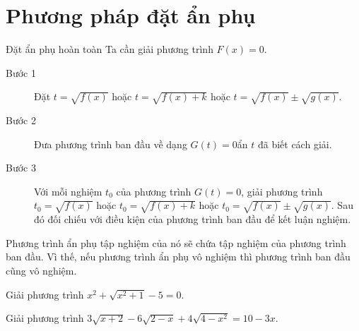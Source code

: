 
\section{Phương pháp đặt ẩn phụ}

\begin{dang}{Đặt ẩn phụ hoàn toàn}
\noindent Ta cần giải phương trình $ F(x)=0 $.
	
		\begin{description}
			\item[Bước 1] Đặt $ t=\sqrt{f(x)} $ hoặc $ t=\sqrt{f(x)+k} $ hoặc $ t=\sqrt{f(x)}\pm \sqrt{g(x)} $.
			\item[Bước 2] Đưa phương trình ban đầu về dạng $ G(t)=0 $ẩn $ t $ đã biết cách giải.
			\item[Bước 3] Với mỗi nghiệm $ t _0$ của phương trình $ G(t)=0 $,  giải phương trình $ t_0=\sqrt{f(x)} $ hoặc $ t_0=\sqrt{f(x)+k} $ hoặc $ t_0=\sqrt{f(x)}\pm \sqrt{g(x)} $. Sau đó đối  chiếu với điều kiện của phương trình ban đầu để kết luận nghiệm.
		\end{description}
	
\end{dang}

\begin{note}
	Phương trình ẩn phụ tập nghiệm của nó sẽ chứa tập nghiệm của phương trình ban đầu. Vì thế, nếu phương trình ẩn phụ vô nghiệm thì phương trình ban đầu cũng vô nghiệm.
\end{note}
\begin{bt}%
Giải phương trình $ x^2+\sqrt{x^2+1}-5=0. $
\end{bt}
%
\begin{bt}%
	Giải phương trình $ 3\sqrt{x+2}-6\sqrt{2-x}+4\sqrt{4-x^2}=10-3x. $
\end{bt}


